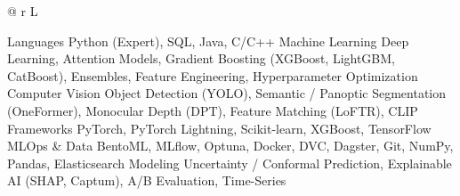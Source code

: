 
\renewenvironment{cvskills}{%
  \vspace{\acvSectionContentTopSkip}
  \vspace{-2.0mm}
  \begin{center}
    \setlength\tabcolsep{1ex}
    \setlength{\extrarowheight}{0pt}
    \begin{tabular*}{\textwidth}{@{\extracolsep{\fill}} r L{\textwidth * }}
}{%
    \end{tabular*}
  \end{center}
}

\begin{cvskills}
  \cvskill
    {Languages}
    {Python (Expert), SQL, Java, C/C++}
  \cvskill
    {Machine Learning}
    {Deep Learning, Attention Models, Gradient Boosting (XGBoost, LightGBM, CatBoost), Ensembles, Feature Engineering, Hyperparameter Optimization}
  \cvskill
    {Computer Vision}
    {Object Detection (YOLO), Semantic / Panoptic Segmentation (OneFormer), Monocular Depth (DPT), Feature Matching (LoFTR), CLIP}
  \cvskill
    {Frameworks}
    {PyTorch, PyTorch Lightning, Scikit-learn, XGBoost, TensorFlow}
  \cvskill
    {MLOps \& Data}
    {BentoML, MLflow, Optuna, Docker, DVC, Dagster, Git, NumPy, Pandas, Elasticsearch}
  \cvskill
    {Modeling}
    {Uncertainty / Conformal Prediction, Explainable AI (SHAP, Captum), A/B Evaluation, Time-Series}
\end{cvskills}
